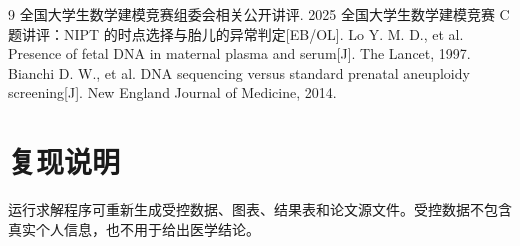 \documentclass[UTF8]{ctexart}
\begin{document}
\begin{thebibliography}{9}
 全国大学生数学建模竞赛组委会相关公开讲评. 2025 全国大学生数学建模竞赛 C 题讲评：NIPT 的时点选择与胎儿的异常判定[EB/OL].
 Lo Y. M. D., et al. Presence of fetal DNA in maternal plasma and serum[J]. The Lancet, 1997.
 Bianchi D. W., et al. DNA sequencing versus standard prenatal aneuploidy screening[J]. New England Journal of Medicine, 2014.
\end{thebibliography}

\appendix
\section{复现说明}
运行求解程序可重新生成受控数据、图表、结果表和论文源文件。受控数据不包含真实个人信息，也不用于给出医学结论。
\end{document}
